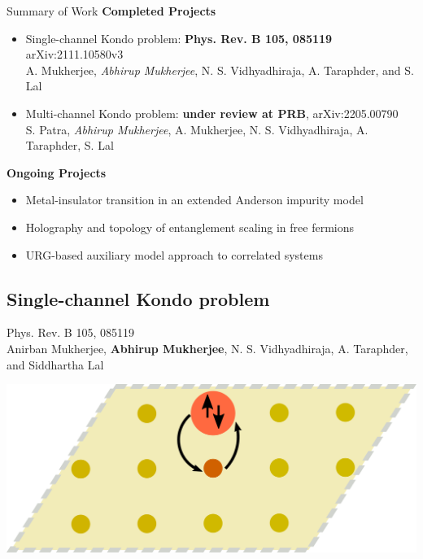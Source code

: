\documentclass[10pt,aspectratio=169]{beamer}
\begin{document}
\begin{frame}{Summary of Work}
\flushleft 
{\bf Completed Projects}
\vspace*{\fill}
\begin{itemize}
	\item Single-channel Kondo problem: {\bf Phys. Rev. B 105, 085119} arXiv:2111.10580v3 \\
	{\small A. Mukherjee, {\it Abhirup Mukherjee}, N. S. Vidhyadhiraja, A. Taraphder, and S. Lal}\\[10pt]
\item Multi-channel Kondo problem: {\bf under review at PRB}, arXiv:2205.00790\\
{\small S. Patra, {\it Abhirup Mukherjee}, A. Mukherjee, N. S. Vidhyadhiraja, A. Taraphder, S. Lal} \\[10pt]
\end{itemize}
\vspace*{\fill}

{\bf Ongoing Projects}
\vspace*{\fill}
\begin{itemize}
	\item Metal-insulator transition in an extended Anderson impurity model\\[10pt]
	\item Holography and topology of entanglement scaling in free fermions\\[10pt]
	\item URG-based auxiliary model approach to correlated systems
\end{itemize}

\end{frame}

\begin{frame}{}
\section{Single-channel Kondo problem}
\begin{minipage}{0.55\textwidth}
\small{Phys. Rev. B 105, 085119\\[10pt]
Anirban Mukherjee, {\bf Abhirup Mukherjee}, N. S. Vidhyadhiraja, A. Taraphder, and Siddhartha Lal}
\end{minipage}
\hspace*{\fill}
\begin{minipage}{0.4\textwidth}
	\includegraphics[width=\textwidth]{kondo-effect.pdf}
\end{minipage}
\end{frame}
\end{document}
